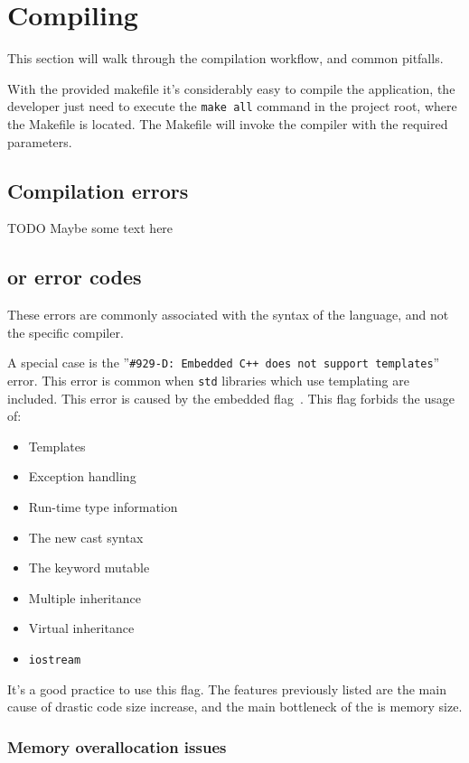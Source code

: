 \section{Compiling}

This section will walk through the compilation workflow, and common pitfalls.

With the provided makefile it's considerably easy to compile the application, the developer just need to execute the \verb|make all| command in the project root, where the Makefile is located. The Makefile will invoke the compiler with the required parameters.

\subsection{Compilation errors}

TODO Maybe some text here

\subsection{\cpl{} or \cpp{} error codes}

These errors are commonly associated with the syntax of the language, and not the specific compiler.

A special case is the ''\verb|#929-D: Embedded C++ does not support templates|'' error. This error is common when \verb+std+ libraries which use templating are included. This error is caused by the embedded \cpp{} flag~\cite[Section 5.13.4]{PRU_C_CPP}. This flag forbids the usage of:
\begin{itemize}
	\item Templates
	\item Exception handling
	\item Run-time type information
	\item The new cast syntax
	\item The keyword mutable
	\item Multiple inheritance
	\item Virtual inheritance
	\item \verb|iostream|
\end{itemize}

It's a good practice to use this flag. The features previously listed are the main cause of drastic code size increase, and the main bottleneck of the \pru{} is memory size.

\subsubsection{Memory overallocation issues}

